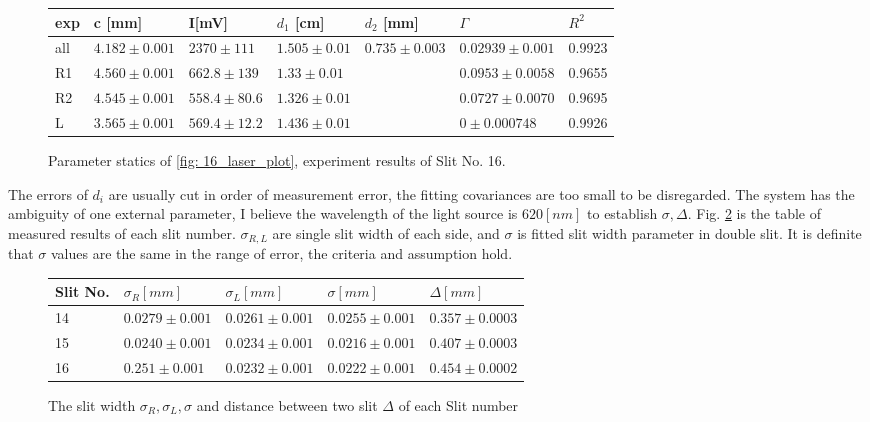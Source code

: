 \documentclass{article}
\begin{document}
\begin{figure}[H]
  \begin{tabular}{  m{0.6cm}|m{2cm}|m{1.7cm}|m{2cm}|m{2.3cm}|m{2.3cm}|m{1cm} } 
      exp & c [mm]& I[mV] & $d_1$ [cm] & $d_2$ [mm] & $\Gamma$ & $R^2$ \\ \hline \hline
      all& $4.182 \pm 0.001$& $2370 \pm 111$& $1.505 \pm 0.01$& $0.735 \pm 0.003$& $0.02939 \pm 0.001$& 0.9923\\ \hline 
      R1& $4.560 \pm 0.001$& $662.8 \pm 139$& $1.33 \pm 0.01$& &$0.0953 \pm 0.0058$& 0.9655\\ \hline 
      R2& $4.545 \pm 0.001$& $558.4 \pm 80.6$& $1.326 \pm 0.01$& &$0.0727 \pm 0.0070$& 0.9695\\ \hline 
      L& $3.565 \pm 0.001$& $569.4 \pm 12.2$& $1.436 \pm 0.01$& &$0 \pm 0.000748$& 0.9926\\ \hline 

  \end{tabular}
  \caption{Parameter statics of \ref{fig: 16_laser_plot}, experiment results of Slit No. 16.}
  \label{fig: 16_laser_parmeters}
\end{figure}

The errors of $d_i$ are usually cut in order of measurement error, the fitting covariances are too small to be disregarded.
The system has the ambiguity of one external parameter, I believe the wavelength of the light source is $620 [nm]$ to establish $\sigma, \Delta$.
Fig. \ref{fig: laser_slit_spec} is the table of measured results of each slit number.
$\sigma_{R,L}$ are single slit width of each side, and $\sigma$ is fitted slit width parameter in double slit.
It is definite that $\sigma$ values are the same in the range of error, the criteria and assumption hold.

\begin{figure}[H]
  \centering
  \begin{tabular}{  m{2cm}|m{2.5cm}|m{2.5cm}|m{2.5cm}|m{2.5cm}} 
    Slit No. & $\sigma_R [mm]$ &$\sigma_L [mm]$ &$\sigma [mm]$ & $\Delta [mm]$ \\ \hline \hline
    14 &   $0.0279 \pm 0.001 $& $ 0.0261 \pm 0.001 $ & $0.0255  \pm 0.001 $  & $0.357  \pm 0.0003 $ \\ \hline
    15 &  $0.0240  \pm 0.001 $ & $0.0234 \pm 0.001 $ & $0.0216   \pm 0.001 $ & $0.407  \pm 0.0003 $\\ \hline
    16 &  $0.251  \pm 0.001 $ & $0.0232 \pm 0.001 $ & $0.0222 \pm 0.001 $   & $ 0.454  \pm 0.0002 $   \\ 
    
  \end{tabular}
  \caption{The slit width $\sigma_R, \sigma_L, \sigma$ and distance between two slit $\Delta$ of each Slit number}
  \label{fig: laser_slit_spec}
\end{figure}
\end{document}
